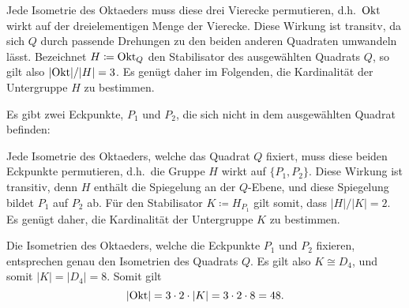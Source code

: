 \begin{itemize}
    Jede Isometrie des Oktaeders muss diese drei Vierecke permutieren, d.h.\ $\mathrm{Okt}$ wirkt auf der dreielementigen Menge der Vierecke.
    Diese Wirkung ist transitv, da sich $Q$ durch passende Drehungen zu den beiden anderen Quadraten umwandeln lässt.
    Bezeichnet $H \coloneqq \mathrm{Okt}_Q$ den Stabilisator des ausgewählten Quadrats $Q$, so gilt also $|{\mathrm{Okt}}|/|H| = 3$.
    Es genügt daher im Folgenden, die Kardinalität der Untergruppe $H$ zu bestimmen.

    Es gibt zwei Eckpunkte, $P_1$ und $P_2$, die sich nicht in dem ausgewählten Quadrat befinden:
    \begin{center}
    \end{center}
    Jede Isometrie des Oktaeders, welche das Quadrat $Q$ fixiert, muss diese beiden Eckpunkte permutieren, d.h.\ die Gruppe $H$ wirkt auf $\{P_1, P_2\}$.
    Diese Wirkung ist transitiv, denn $H$ enthält die Spiegelung an der $Q$-Ebene, und diese Spiegelung bildet $P_1$ auf $P_2$ ab.
    Für den Stabilisator $K \coloneqq H_{P_1}$ gilt somit, dass $|H|/|K| = 2$.
    Es genügt daher, die Kardinalität der Untergruppe $K$ zu bestimmen.
    
    Die Isometrien des Oktaeders, welche die Eckpunkte $P_1$ und $P_2$ fixieren, entsprechen genau den Isometrien des Quadrats $Q$.
    Es gilt also $K \cong D_4$, und somit $|K| = |D_4| = 8$.
    Somit gilt
    \[
        |{\mathrm{Okt}}|
      = 3 \cdot 2 \cdot |K|
      = 3 \cdot 2 \cdot 8
      = 48.
    \]
    

\end{itemize}
